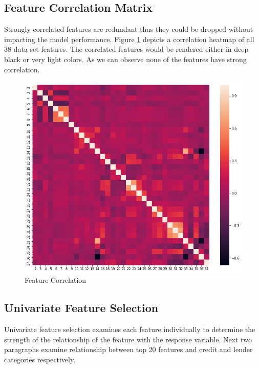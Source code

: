 \hypertarget{feature-correlation-matrix}{%
\subsection{Feature Correlation
Matrix}\label{feature-correlation-matrix}}

Strongly correlated features are redundant thus they could be dropped
without impacting the model performance. Figure \ref{fig:cmatrix}
depicts a correlation heatmap of all 38 data set features. The
correlated features would be rendered either in deep black or very light
colors. As we can observe none of the features have strong correlation.

\begin{Schunk}
\begin{figure}[H]

{\centering \includegraphics[width=0.75\linewidth]{../../artifacts/cmatrix} 

}

\caption[Feature Correlation]{Feature Correlation}\label{fig:cmatrix}
\end{figure}
\end{Schunk}

\hypertarget{univariate-feature-selection}{%
\subsection{Univariate Feature
Selection}\label{univariate-feature-selection}}

Univariate feature selection examines each feature individually to
determine the strength of the relationship of the feature with the
response variable. Next two paragraphs examine relationship between top
20 features and credit and lender categories respectively.

